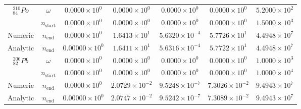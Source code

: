 \begin{table}[h]
\begin{center}
\begin{longtable}{c c c c c c c}
\hline
${}^{210}_{84}Po$ & $\omega$ & 
${0.0000} \times 10^{0}$ & ${0.0000} \times 10^{0}$ & ${0.0000} \times 10^{0}$ &
${0.0000} \times 10^{0}$ & ${5.2000} \times 10^{2}$ \\
 & $n_{\text{start}}$ & 
${0.0000} \times 10^{0}$ & ${0.0000} \times 10^{0}$ & ${0.0000} \times 10^{0}$ &
${0.0000} \times 10^{0}$ & ${1.5000} \times 10^{3}$ \\
Numeric & $n_{\text{end}}$ & 
${0.0000} \times 10^{0}$ & ${1.6413} \times 10^{1}$ & ${5.6320} \times 10^{-4}$ & 
${5.7726} \times 10^{1}$ & ${4.4948} \times 10^{7}$ \\
Analytic & $n_{\text{end}}$ & 
${0.00000} \times 10^{0}$ & ${1.6411} \times 10^{1}$ & ${5.6316} \times 10^{-4}$ & 
${5.7722} \times 10^{1}$ & ${4.4948} \times 10^{7}$ \\
\hline
${}^{206}_{82}Pb$ & $\omega$ & 
${0.0000} \times 10^{0}$ & ${0.0000} \times 10^{0}$ & ${0.0000} \times 10^{0}$ &
${0.0000} \times 10^{0}$ & ${1.0000} \times 10^{3}$ \\
 & $n_{\text{start}}$ & 
${0.0000} \times 10^{0}$ & ${0.0000} \times 10^{0}$ & ${0.0000} \times 10^{0}$ &
${0.0000} \times 10^{0}$ & ${1.0000} \times 10^{4}$ \\
Numeric & $n_{\text{end}}$ & 
${0.0000} \times 10^{0}$ & ${2.0729} \times 10^{-2}$ & ${9.5248} \times 10^{-7}$ & 
${7.3026} \times 10^{-2}$ & ${9.4943} \times 10^{7}$ \\
Analytic & $n_{\text{end}}$ & 
${0.00000} \times 10^{0}$ & ${2.0747} \times 10^{-2}$ & ${9.5242} \times 10^{-7}$ & 
${7.3089} \times 10^{-2}$ & ${9.4943} \times 10^{7}$ \\
\hline\hline
\end{longtable}
\end{center}
\caption{}
\label{table:rn218trialdata}
\end{table}
































